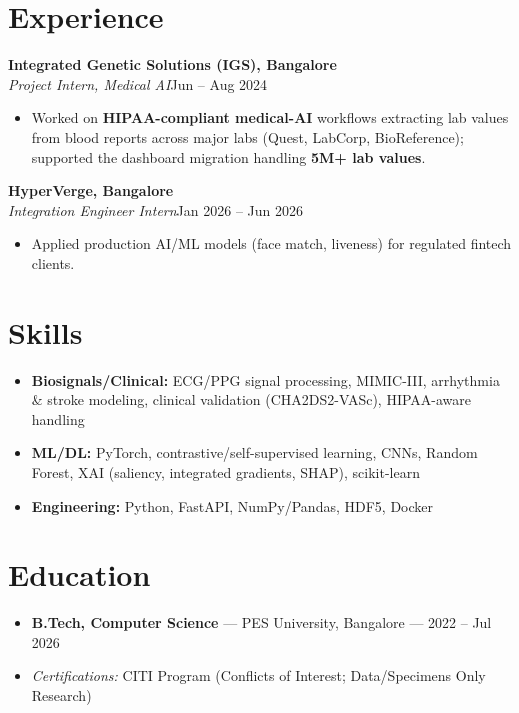 \documentclass[10pt,a4paper]{article}
\begin{document}
\section*{Experience}
\vspace{1pt}\textbf{Integrated Genetic Solutions (IGS), Bangalore}\\
\textit{Project Intern, Medical AI}\hfill Jun -- Aug 2024\par\vspace{1pt}
\begin{itemize}
\item Worked on \textbf{HIPAA-compliant medical-AI} workflows extracting lab values from blood reports across major labs (Quest, LabCorp, BioReference); supported the dashboard migration handling \textbf{5M+ lab values}.
\end{itemize}
\vspace{1pt}\textbf{HyperVerge, Bangalore}\\
\textit{Integration Engineer Intern}\hfill Jan 2026 -- Jun 2026\par\vspace{1pt}
\begin{itemize}
\item Applied production AI/ML models (face match, liveness) for regulated fintech clients.
\end{itemize}
\section*{Skills}
\begin{itemize}
\item \textbf{Biosignals/Clinical:} ECG/PPG signal processing, MIMIC-III, arrhythmia \& stroke modeling, clinical validation (CHA2DS2-VASc), HIPAA-aware handling
\item \textbf{ML/DL:} PyTorch, contrastive/self-supervised learning, CNNs, Random Forest, XAI (saliency, integrated gradients, SHAP), scikit-learn
\item \textbf{Engineering:} Python, FastAPI, NumPy/Pandas, HDF5, Docker
\end{itemize}
\section*{Education}
\begin{itemize}
\item \textbf{B.Tech, Computer Science} --- PES University, Bangalore --- 2022 -- Jul 2026
\item \textit{Certifications:} CITI Program (Conflicts of Interest; Data/Specimens Only Research)
\end{itemize}
\end{document}

